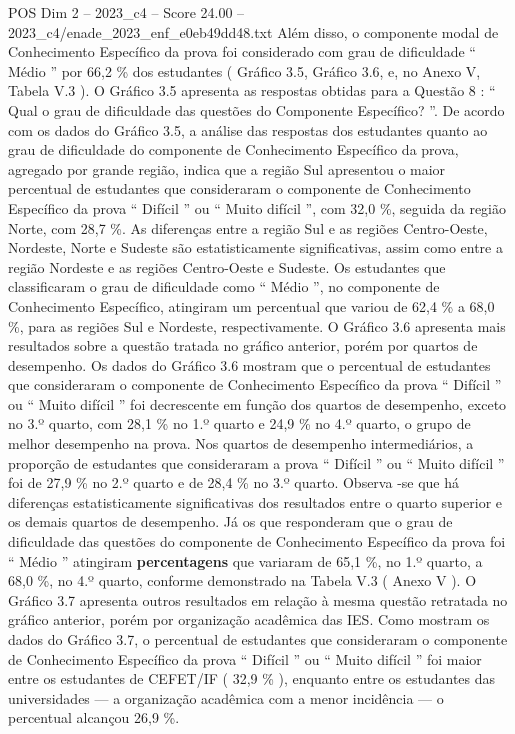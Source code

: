 \begin{textsample}{POS Dim 2 – 2023\_c4 – Score 24.00 – 2023\_c4/enade\_2023\_enf\_e0eb49dd48.txt}
Além disso, o componente modal de Conhecimento Específico da prova foi considerado com grau de dificuldade “ Médio ” por 66,2 \% dos estudantes ( Gráfico 3.5, Gráfico 3.6, e, no Anexo V, Tabela V.3 ).
O Gráfico 3.5 apresenta as respostas obtidas para a Questão 8 : “ Qual o grau de dificuldade das questões do Componente Específico? ”.
De acordo com os dados do Gráfico 3.5, a análise das respostas dos estudantes quanto ao grau de dificuldade do componente de Conhecimento Específico da prova, agregado por grande região, indica que a região Sul apresentou o maior percentual de estudantes que consideraram o componente de Conhecimento Específico da prova “ Difícil ” ou “ Muito difícil ”, com 32,0 \%, seguida da região Norte, com 28,7 \%.
As diferenças entre a região Sul e as regiões Centro-Oeste, Nordeste, Norte e Sudeste são estatisticamente significativas, assim como entre a região Nordeste e as regiões Centro-Oeste e Sudeste.
Os estudantes que classificaram o grau de dificuldade como “ Médio ”, no componente de Conhecimento Específico, atingiram um percentual que variou de 62,4 \% a 68,0 \%, para as regiões Sul e Nordeste, respectivamente.
O Gráfico 3.6 apresenta mais resultados sobre a questão tratada no gráfico anterior, porém por quartos de desempenho.
Os dados do Gráfico 3.6 mostram que o percentual de estudantes que consideraram o componente de Conhecimento Específico da prova “ Difícil ” ou “ Muito difícil ” foi decrescente em função dos quartos de desempenho, exceto no 3.º quarto, com 28,1 \% no 1.º quarto e 24,9 \% no 4.º quarto, o grupo de melhor desempenho na prova.
Nos quartos de desempenho intermediários, a proporção de estudantes que consideraram a prova “ Difícil ” ou “ Muito difícil ” foi de 27,9 \% no 2.º quarto e de 28,4 \% no 3.º quarto.
Observa -se que há diferenças estatisticamente significativas dos resultados entre o quarto superior e os demais quartos de desempenho.
Já os que responderam que o grau de dificuldade das questões do componente de Conhecimento Específico da prova foi “ Médio ” atingiram \textbf{percentagens} que variaram de 65,1 \%, no 1.º quarto, a 68,0 \%, no 4.º quarto, conforme demonstrado na Tabela V.3 ( Anexo V ).
O Gráfico 3.7 apresenta outros resultados em relação à mesma questão retratada no gráfico anterior, porém por organização acadêmica das IES.
Como mostram os dados do Gráfico 3.7, o percentual de estudantes que consideraram o componente de Conhecimento Específico da prova “ Difícil ” ou “ Muito difícil ” foi maior entre os estudantes de CEFET/IF ( 32,9 \% ), enquanto entre os estudantes das universidades — a organização acadêmica com a menor incidência — o percentual alcançou 26,9 \%.

\end{textsample}
